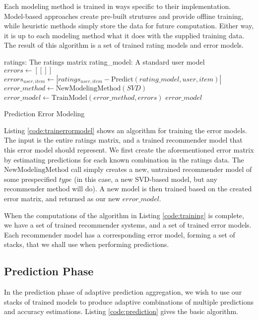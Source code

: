 Each modeling method is trained in ways specific to their implementation. 
Model-based approaches create pre-built strutures and provide offline training,
while heuristic methods simply store the data for future computation.
Either way, it is up to each modeling method what it does with the supplied training data.
The result of this algorithm is a set of trained rating models and error models.

\begin{algorithm}
  \begin{algorithmic}[1]
  \REQUIRE ratings: The ratings matrix
  \REQUIRE rating\_model: A standard user model
  \ENSURE
    \STATE $errors \gets [[]]$
        \STATE $errors_{user,item} \gets | ratings_{user,item} - \mathrm{Predict}(rating\_model, user, item) |$
    \ENDFOR 
    \STATE $error\_method \gets \mathrm{NewModelingMethod}(SVD)$
    \STATE $error\_model  \gets \mathrm{TrainModel}(error\_method, errors)$
  \RETURN $error\_model$
  \end{algorithmic}
  \caption[Prediction Error Modeling]{Prediction Error Modeling}
  \label{code:trainerrormodel}
\end{algorithm}

Listing \ref{code:trainerrormodel} shows an algorithm for training the error models.
The input is the entire ratings matrix, and a trained recommender model
that this error model should represent.
We first create the aforementioned error matrix by estimating
predictions for each known combination in the ratings data.
The $\mathrm{NewModelingMethod}$ call simply creates a new, untrained
recommender model of some prespecified $type$
(in this case, a new SVD-based model, but any recommender method will do).
A new model is then trained based on the created error matrix,
and returned as our new $error\_model$.

When the computations of the algorithm in Listing \ref{code:training} is complete,
we have a set of trained recommender systems, and a set of trained error models.
Each recommender model has a corresponding error model,
forming a set of stacks, that we shall use when performing predictions.


\subsection{Prediction Phase}

In the prediction phase of adaptive prediction aggregation,
we wish to use our stacks of trained models to produce adaptive
combinations of multiple predictions and accuracy estimations.
Listing \ref{code:prediction} gives the basic algorithm.

